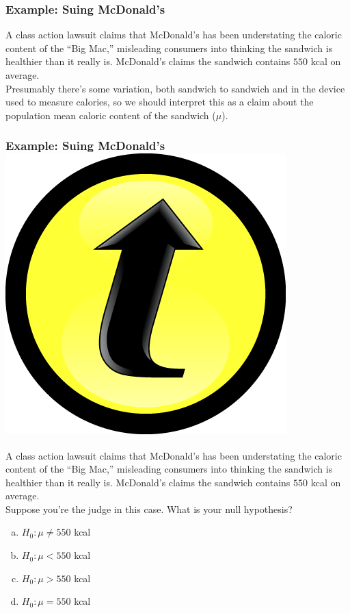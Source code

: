 \documentclass[handout]{beamer}
\begin{document}
\begin{frame}
\frametitle{Example: Suing McDonald's}

A class action lawsuit claims that McDonald's has been  understating the caloric content of the ``Big Mac,'' misleading consumers into thinking the sandwich is healthier than it really is. McDonald's claims the sandwich contains $550$ kcal on average. \\

\vspace{1em}
Presumably there's some variation, both sandwich to sandwich and in the device used to measure calories, so we should interpret this as a claim about the \alert{population mean} caloric content of the sandwich ($\mu$).
\end{frame}



\begin{frame}
\frametitle{Example: Suing McDonald's \hfill \includegraphics[scale = 0.05]{./images/clicker}}

A class action lawsuit claims that McDonald's has been  understating the caloric content of the ``Big Mac,'' misleading consumers into thinking the sandwich is healthier than it really is. McDonald's claims the sandwich contains $550$ kcal on average. \\

\vspace{1em}
\alert{Suppose you're the judge in this case. What is your null hypothesis?}

	\begin{enumerate}[(a)]
		\item $H_0\colon \mu \neq 550$ kcal
		\item $H_0\colon \mu < 550$ kcal
		\item $H_0\colon \mu > 550$ kcal
		\item $H_0\colon \mu = 550$ kcal
\end{enumerate}
\end{frame}
\end{document}
